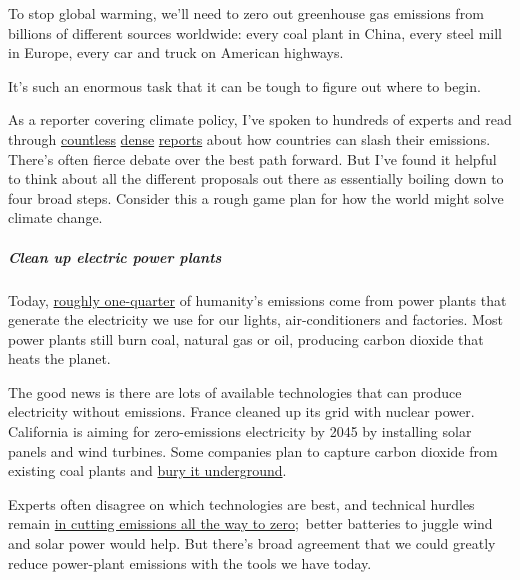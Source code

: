 To stop global warming, we'll need to zero out greenhouse gas emissions
from billions of different sources worldwide: every coal plant in China,
every steel mill in Europe, every car and truck on American highways.

It's such an enormous task that it can be tough to figure out where to
begin.

As a reporter covering climate policy, I've spoken to hundreds of
experts and read through
\href{http://deepdecarbonization.org/countries/}{countless}
\href{https://www.iea.org/reports/world-energy-model/sustainable-development-scenario}{dense}
\href{https://www.post2020hlp.org/wp-content/uploads/docs/Rockstroem-Sachs-Oehman-Schmidt-Traub_Sustainable-Development-and-Planetary-Boundaries.pdf}{reports}
about how countries can slash their emissions. There's often fierce
debate over the best path forward. But I've found it helpful to think
about all the different proposals out there as essentially boiling down
to four broad steps. Consider this a rough game plan for how the world
might solve climate change.

\hypertarget{clean-up-electric-power-plants}{%
\subparagraph{Clean up electric power
plants}\label{clean-up-electric-power-plants}}

Today,
\href{https://www.wri.org/blog/2020/02/greenhouse-gas-emissions-by-country-sector}{roughly
one-quarter} of humanity's emissions come from power plants that
generate the electricity we use for our lights, air-conditioners and
factories. Most power plants still burn coal, natural gas or oil,
producing carbon dioxide that heats the planet.

The good news is there are lots of available technologies that can
produce electricity without emissions. France cleaned up its grid with
nuclear power. California is aiming for zero-emissions electricity by
2045 by installing solar panels and wind turbines. Some companies plan
to capture carbon dioxide from existing coal plants and
\href{https://www.nytimes3xbfgragh.onion/2020/02/11/climate/carbon-capture-tax.html}{bury
it underground}.

Experts often disagree on which technologies are best, and technical
hurdles remain
\href{http://news.mit.edu/2018/adding-power-choices-reduces-cost-risk-carbon-free-electricity-0906}{in
cutting emissions all the way to zero};~better batteries to juggle wind
and solar power would help. But there's broad agreement that we could
greatly reduce power-plant emissions with the tools we have today.

